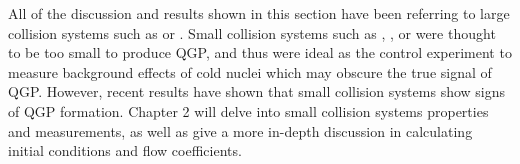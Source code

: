 All of the discussion and results shown in this section have been referring to large collision systems such as \auau or \pbpb. Small collision systems such as \pa, \dau, or \pp were thought to be too small to produce QGP, and thus were ideal as the control experiment to measure background effects of cold nuclei which may obscure the true signal of QGP. However, recent results have shown that small collision systems show signs of QGP formation. Chapter 2 will delve into small collision systems properties and measurements, as well as give a more in-depth discussion in calculating initial conditions and flow coefficients.

